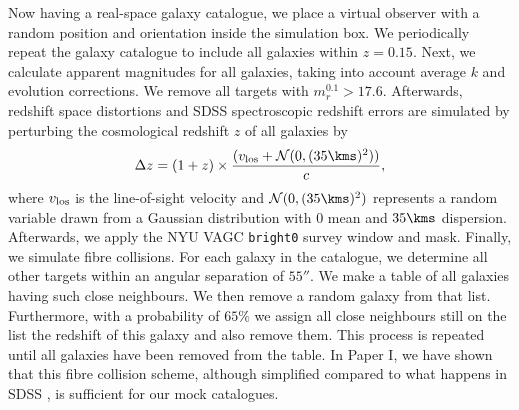 \documentclass[fleqn,usenatbib,useAMS]{mnras}
\begin{document}
Now having a real-space galaxy catalogue, we place a virtual observer with a random position and orientation inside the simulation box. We periodically repeat the galaxy catalogue to include all galaxies within $z = 0.15$. Next, we calculate apparent magnitudes for all galaxies, taking into account average $k$ and evolution corrections. We remove all targets with $m_r^{0.1} > 17.6$. Afterwards, redshift space distortions and SDSS spectroscopic redshift errors are simulated by perturbing the cosmological redshift $z$ of all galaxies by
\begin{equation}
\Delta z = (1 + z) \times \frac{(v_{\rm los} + \mathcal{N}(0, (35 \kms)^2))}{c},
\end{equation}
where $v_{\rm los}$ is the line-of-sight velocity and $\mathcal{N}(0, (35 \kms)^2)$ represents a random variable drawn from a Gaussian distribution with $0$ mean and $35 \kms$ dispersion. Afterwards, we apply the NYU VAGC \texttt{bright0} survey window and mask. Finally, we simulate fibre collisions. For each galaxy in the catalogue, we determine all other targets within an angular separation of $55''$. We make a table of all galaxies having such close neighbours. We then remove a random galaxy from that list. Furthermore, with a probability of $65\%$ we assign all close neighbours still on the list the redshift of this galaxy and also remove them. This process is repeated until all galaxies have been removed from the table. In Paper I, we have shown that this fibre collision scheme, although simplified compared to what happens in SDSS \citep{Blanton+03}, is sufficient for our mock catalogues.
\end{document}
